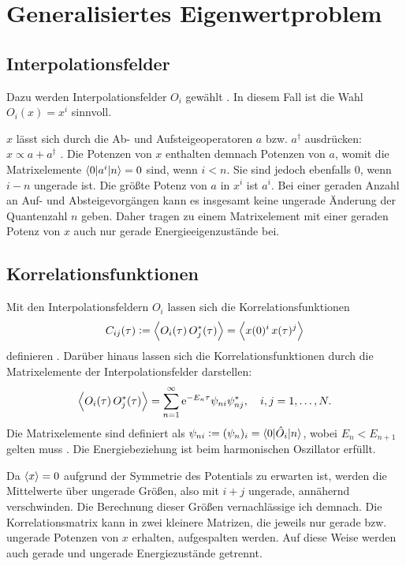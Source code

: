 \section{Generalisiertes Eigenwertproblem}

\subsection{Interpolationsfelder}

Dazu werden Interpolationsfelder $O_i$ gewählt
\parencite[1]{Blossier/Eigenvalue}. In diesem Fall ist die Wahl $O_i(x) = x^i$
sinnvoll.

$x$ lässt sich durch die Ab- und Aufsteigeoperatoren $a$ bzw. $a^\dagger$
ausdrücken: $x \propto a + a^\dagger$
\parencite[(3.5a)]{Schwabl/Quantenmechanik}. Die Potenzen von $x$ enthalten
demnach Potenzen von $a$, womit die Matrixelemente $\braket{0|a^i|n} = 0$ sind,
wenn $i < n$. Sie sind jedoch ebenfalls 0, wenn $i - n$ ungerade ist. Die
größte Potenz von $a$ in $x^i$ ist $a^i$. Bei einer geraden Anzahl an Auf- und
Absteigevorgängen kann es insgesamt keine ungerade Änderung der Quantenzahl $n$
geben. Daher tragen zu einem Matrixelement mit einer geraden Potenz von $x$
auch nur gerade Energieeigenzustände bei.

\subsection{Korrelationsfunktionen}

Mit den Interpolationsfeldern $O_i$ lassen sich die Korrelationsfunktionen
\[
    C_{ij}(\tau) := \left\langle O_i(\tau) \, O_j^*(\tau) \right\rangle
    = \left\langle x(0)^i \, x(\tau)^j \right\rangle
\]
definieren \parencite[(2.1)]{Blossier/Eigenvalue}. Darüber hinaus lassen sich
die Korrelationsfunktionen durch die Matrixelemente der Interpolationsfelder
darstellen:
\[
    \left\langle O_i(\tau) \, O_j^*(\tau) \right\rangle
    = \sum_{n=1}^\infty \mathrm e^{-E_n \tau} \psi_{ni} \psi_{nj}^*
    ,\quad
    i, j = 1, \ldots, N.
\]
Die Matrixelemente sind definiert als $\psi_{ni} := (\psi_n)_i = \braket{0 |
\hat O_i | n}$, wobei $E_n < E_{n+1}$ gelten muss
\parencite[(2.1)]{Blossier/Eigenvalue}. Die Energiebeziehung ist beim
harmonischen Oszillator erfüllt.

Da $\langle x \rangle = 0$ aufgrund der Symmetrie des Potentials zu erwarten ist,
werden die Mittelwerte über ungerade Größen, also mit $i + j$ ungerade,
annähernd verschwinden. Die Berechnung dieser Größen vernachlässige ich
demnach. Die Korrelationsmatrix kann in zwei kleinere Matrizen, die jeweils
nur gerade bzw. ungerade Potenzen von $x$ erhalten, aufgespalten werden. Auf
diese Weise werden auch gerade und ungerade Energiezustände getrennt.

